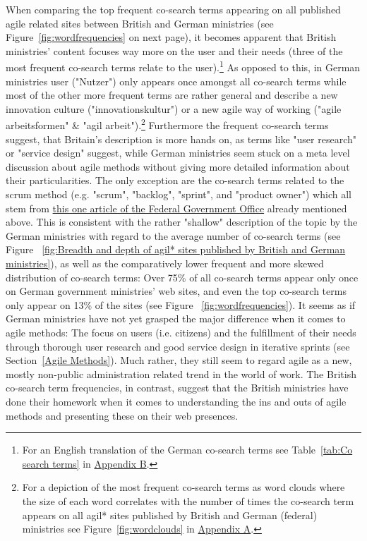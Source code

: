 When comparing the top frequent co-search terms appearing on all published agile related sites between British and German ministries (see Figure~\ref{fig:wordfrequencies} on next page), it becomes apparent that British ministries' content focuses way more on the user and their needs (three of the most frequent co-search terms relate to the user).\footnote{For an English translation of the German co-search terms see Table~\ref{tab:Co search terms} in \hyperref[Appendix B]{Appendix B}.} As opposed to this, in German ministries user ("Nutzer") only appears once amongst all co-search terms while most of the other more frequent terms are rather general and describe a new innovation culture ("innovationskultur") or a new agile way of working ("agile arbeitsformen"  \& "agil arbeit").\footnote{For a depiction of the most frequent co-search terms as word clouds where the size of each word correlates with the number of times the co-search term appears on all agil* sites published by British and German (federal) ministries see Figure~\ref{fig:wordclouds} in \hyperref[Appendix A]{Appendix A}.} Furthermore the frequent co-search terms suggest, that Britain's description is more hands on, as terms like "user research" or "service design" suggest, while German ministries seem stuck on a meta level discussion about agile methods without giving more detailed information about their particularities. The only exception are the co-search terms related to the scrum method (e.g. "scrum", "backlog", "sprint", and "product owner") which all stem from \href{https://www.bundesregierung.de/breg-de/themen/forschung/agil-arbeiten-bei-der-software-entwicklung-276792}{this one article of the Federal Government Office} already mentioned above. This is consistent with the rather "shallow" description of the topic by the German ministries with regard to the average number of co-search terms (see Figure
~\ref{fig:Breadth and depth of agil* sites published by British and German ministries}), as well as the comparatively lower frequent and more skewed distribution of co-search terms: Over 75\% of all co-search terms appear only once on German government ministries' web sites, and even the top co-search terms only appear on 13\% of the sites (see Figure
~\ref{fig:wordfrequencies}). It seems as if German ministries have not yet grasped the major difference when it comes to agile methods: The focus on users (i.e. citizens) and the fulfillment of their needs through thorough user research and good service design in iterative sprints (see Section~\ref{Agile Methods}). Much rather, they still seem to regard agile as a new, mostly non-public administration related trend in the world of work. The British co-search term frequencies, in contrast, suggest that the British ministries have done their homework when it comes to understanding the ins and outs of agile methods and presenting these on their web presences.


